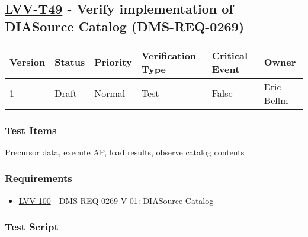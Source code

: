 \hypertarget{lvv-t49---verify-implementation-of-diasource-catalog-dms-req-0269}{%
\subsection{\texorpdfstring{\href{https://jira.lsstcorp.org/secure/Tests.jspa\#/testCase/LVV-T49}{LVV-T49}
- Verify implementation of DIASource Catalog
(DMS-REQ-0269)}{LVV-T49 - Verify implementation of DIASource Catalog (DMS-REQ-0269)}}\label{lvv-t49---verify-implementation-of-diasource-catalog-dms-req-0269}}

\begin{longtable}[]{@{}llllll@{}}
\toprule
Version & Status & Priority & Verification Type & Critical Event &
Owner\tabularnewline
\midrule
\endhead
1 & Draft & Normal & Test & False & Eric Bellm\tabularnewline
\bottomrule
\end{longtable}

\hypertarget{test-items-25}{%
\subsubsection{Test Items}\label{test-items-25}}

Precursor data, execute AP, load results, observe catalog contents

\hypertarget{requirements-26}{%
\subsubsection{Requirements}\label{requirements-26}}

\begin{itemize}
\tightlist
\item
  \href{https://jira.lsstcorp.org/browse/LVV-100}{LVV-100} -
  DMS-REQ-0269-V-01: DIASource Catalog
\end{itemize}

\hypertarget{test-script-26}{%
\subsubsection{Test Script}\label{test-script-26}}


